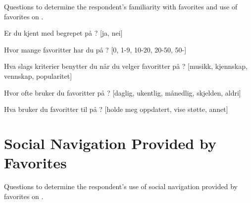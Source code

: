 Questions to determine the respondent's familiarity with favorites and use of
favorites on \urort{}.

\begin{items}
  \item Er du kjent med begrepet  på \urort{}? [ja, nei]
  \item Hvor mange favoritter har du på \urort{}? [0, 1-9, 10-20, 20-50, 50-]
  \item Hva slags kriterier benytter du når du velger favoritter på
    \urort{}? [musikk, kjennskap, vennskap, popularitet]
  \item Hvor ofte bruker du favoritter på \urort{}?
    [daglig, ukentlig, månedlig, skjelden, aldri]
  \item Hva bruker du favoritter til på \urort{}?
    [holde meg oppdatert, vise støtte, annet]
\end{items}

\section{Social Navigation Provided by Favorites}

Questions to determine the respondent's use of
social navigation provided by favorites on \urort{}.

